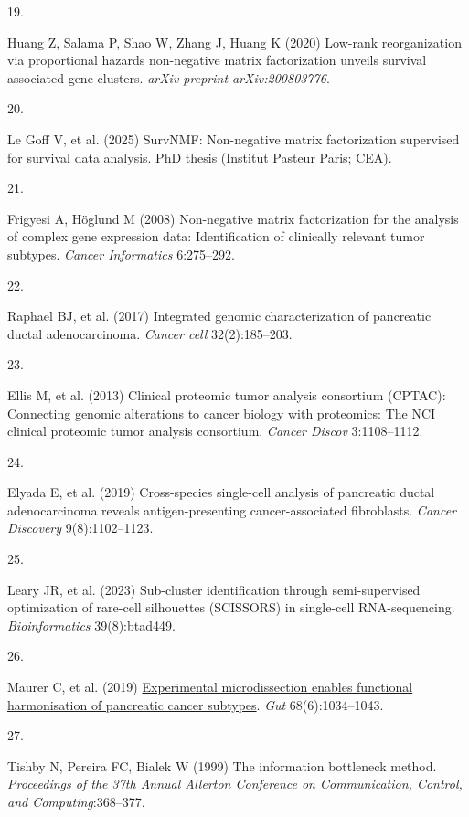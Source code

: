 \documentclass[9pt,twocolumn,twoside,]{pnas-new}
\newlength{\cslhangindent}
\newlength{\csllabelwidth}
\newenvironment{CSLReferences}[2] %
 {\begin{list}{}{%
  \setlength{\itemindent}{0pt}
  \setlength{\leftmargin}{0pt}
  \setlength{\parsep}{0pt}
  \ifodd #1
   \setlength{\leftmargin}{\cslhangindent}
   \setlength{\itemindent}{-1\cslhangindent}
  \fi
  \setlength{\itemsep}{#2\baselineskip}}}
 {\end{list}}
\newcommand{\CSLLeftMargin}[1]{\parbox[t]{\csllabelwidth}{#1}}
\newcommand{\CSLRightInline}[1]{\parbox[t]{\linewidth - \csllabelwidth}{#1}\break}
\begin{document}
\begin{CSLReferences}{0}{1}
\CSLLeftMargin{19. }%
\CSLRightInline{Huang Z, Salama P, Shao W, Zhang J, Huang K (2020)
Low-rank reorganization via proportional hazards non-negative matrix
factorization unveils survival associated gene clusters. \emph{arXiv
preprint arXiv:200803776}.}

\CSLLeftMargin{20. }%
\CSLRightInline{Le Goff V, et al. (2025) SurvNMF: Non-negative matrix
factorization supervised for survival data analysis. PhD thesis
(Institut Pasteur Paris; CEA).}

\CSLLeftMargin{21. }%
\CSLRightInline{Frigyesi A, Höglund M (2008) Non-negative matrix
factorization for the analysis of complex gene expression data:
Identification of clinically relevant tumor subtypes. \emph{Cancer
Informatics} 6:275--292.}

\CSLLeftMargin{22. }%
\CSLRightInline{Raphael BJ, et al. (2017) Integrated genomic
characterization of pancreatic ductal adenocarcinoma. \emph{Cancer cell}
32(2):185--203.}

\CSLLeftMargin{23. }%
\CSLRightInline{Ellis M, et al. (2013) Clinical proteomic tumor analysis
consortium (CPTAC): Connecting genomic alterations to cancer biology
with proteomics: The NCI clinical proteomic tumor analysis consortium.
\emph{Cancer Discov} 3:1108--1112.}

\CSLLeftMargin{24. }%
\CSLRightInline{Elyada E, et al. (2019) Cross-species single-cell
analysis of pancreatic ductal adenocarcinoma reveals antigen-presenting
cancer-associated fibroblasts. \emph{Cancer Discovery} 9(8):1102--1123.}

\CSLLeftMargin{25. }%
\CSLRightInline{Leary JR, et al. (2023) Sub-cluster identification
through semi-supervised optimization of rare-cell silhouettes
({SCISSORS}) in single-cell {RNA}-sequencing. \emph{Bioinformatics}
39(8):btad449.}

\CSLLeftMargin{26. }%
\CSLRightInline{Maurer C, et al. (2019)
\href{https://doi.org/10.1136/gutjnl-2018-317706}{Experimental
microdissection enables functional harmonisation of pancreatic cancer
subtypes}. \emph{Gut} 68(6):1034--1043.}

\CSLLeftMargin{27. }%
\CSLRightInline{Tishby N, Pereira FC, Bialek W (1999) The information
bottleneck method. \emph{Proceedings of the 37th Annual Allerton
Conference on Communication, Control, and Computing}:368--377.}

\end{CSLReferences}



% 
\end{document}
